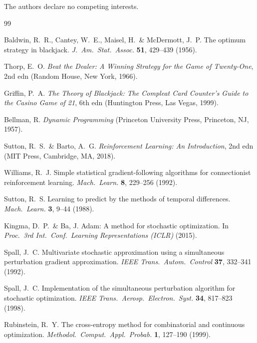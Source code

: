 \documentclass[12pt]{article}
\begin{document}
The authors declare no competing interests.


\begin{thebibliography}{99}

Baldwin, R.\ R., Cantey, W.\ E., Maisel, H.\ \& McDermott, J.\ P.
The optimum strategy in blackjack.
\textit{J.\ Am.\ Stat.\ Assoc.} \textbf{51}, 429--439 (1956).

Thorp, E.\ O.
\textit{Beat the Dealer: A Winning Strategy for the Game of Twenty-One},
2nd edn (Random House, New York, 1966).

Griffin, P.\ A.
\textit{The Theory of Blackjack: The Compleat Card Counter's Guide to the Casino Game
of 21}, 6th edn (Huntington Press, Las Vegas, 1999).

Bellman, R.
\textit{Dynamic Programming} (Princeton University Press, Princeton, NJ, 1957).

Sutton, R.\ S.\ \& Barto, A.\ G.
\textit{Reinforcement Learning: An Introduction}, 2nd edn (MIT Press, Cambridge, MA, 2018).

Williams, R.\ J.
Simple statistical gradient-following algorithms for connectionist reinforcement
learning.
\textit{Mach.\ Learn.} \textbf{8}, 229--256 (1992).

Sutton, R.\ S.
Learning to predict by the methods of temporal differences.
\textit{Mach.\ Learn.} \textbf{3}, 9--44 (1988).

Kingma, D.\ P.\ \& Ba, J.
Adam: A method for stochastic optimization.
In \textit{Proc.\ 3rd Int.\ Conf.\ Learning Representations (ICLR)} (2015).

Spall, J.\ C.
Multivariate stochastic approximation using a simultaneous perturbation gradient
approximation.
\textit{IEEE Trans.\ Autom.\ Control} \textbf{37}, 332--341 (1992).

Spall, J.\ C.
Implementation of the simultaneous perturbation algorithm for stochastic optimization.
\textit{IEEE Trans.\ Aerosp.\ Electron.\ Syst.} \textbf{34}, 817--823 (1998).

Rubinstein, R.\ Y.
The cross-entropy method for combinatorial and continuous optimization.
\textit{Methodol.\ Comput.\ Appl.\ Probab.} \textbf{1}, 127--190 (1999).


\end{thebibliography}
\end{document}
